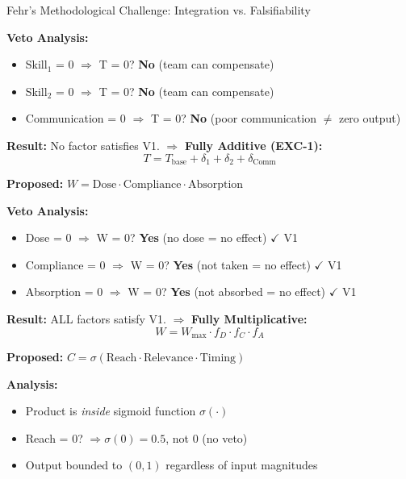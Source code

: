 \begin{chapter}{Fehr's Methodological Challenge: Integration vs. Falsifiability}
\begin{example}
\textbf{Veto Analysis:}
\begin{itemize}[noitemsep]
    \item Skill$_1$ = 0 $\Rightarrow$ T = 0? \textbf{No} (team can compensate)
    \item Skill$_2$ = 0 $\Rightarrow$ T = 0? \textbf{No} (team can compensate)
    \item Communication = 0 $\Rightarrow$ T = 0? \textbf{No} (poor communication $\neq$ zero output)
\end{itemize}

\textbf{Result:} No factor satisfies V1. $\Rightarrow$ \textbf{Fully Additive (EXC-1):}
\begin{equation}
T = T_{\text{base}} + \delta_1 + \delta_2 + \delta_{\text{Comm}}
\end{equation}
\end{example}

\begin{example}
\label{ex:exc-medication}
\textbf{Proposed:} $W = \text{Dose} \cdot \text{Compliance} \cdot \text{Absorption}$

\textbf{Veto Analysis:}
\begin{itemize}[noitemsep]
    \item Dose = 0 $\Rightarrow$ W = 0? \textbf{Yes} (no dose = no effect) $\checkmark$ V1
    \item Compliance = 0 $\Rightarrow$ W = 0? \textbf{Yes} (not taken = no effect) $\checkmark$ V1
    \item Absorption = 0 $\Rightarrow$ W = 0? \textbf{Yes} (not absorbed = no effect) $\checkmark$ V1
\end{itemize}

\textbf{Result:} ALL factors satisfy V1. $\Rightarrow$ \textbf{Fully Multiplicative:}
\begin{equation}
W = W_{\text{max}} \cdot f_D \cdot f_C \cdot f_A
\end{equation}
\end{example}

\begin{example}
\label{ex:exc-conversion}
\textbf{Proposed:} $C = \sigma(\text{Reach} \cdot \text{Relevance} \cdot \text{Timing})$

\textbf{Analysis:}
\begin{itemize}[noitemsep]
    \item Product is \textit{inside} sigmoid function $\sigma(\cdot)$
    \item Reach = 0? $\Rightarrow \sigma(0) = 0.5$, not 0 (no veto)
    \item Output bounded to $(0, 1)$ regardless of input magnitudes
\end{itemize}


\end{example}
\end{chapter}
